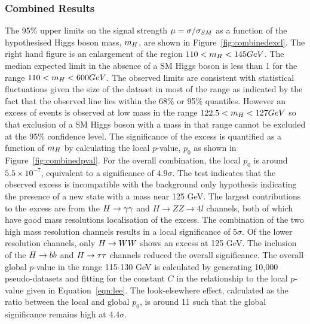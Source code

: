 \subsubsection{Combined Results}
\label{sec:combinedsearchresults}
The 95\% upper limits on the signal strength $\mu=\sigma/\sigma_{SM}$ as a function 
of the hypothesised Higgs boson mass, $m_{H}$, are shown in 
Figure~\ref{fig:combinedexcl}. The right hand figure is an enlargement of
the region $110 < m_{H}  < 145 GeV$. The median expected limit in the absence
of a SM Higgs boson is less than 1 for the range $110< m_{H}<600 GeV$. 
The observed limits are consistent with statistical fluctuations given the 
size of the dataset in most of the range as indicated by the fact that the 
observed line lies within the 68\% or 95\% quantiles. However an
excess of events is observed at low mass in the range $122.5  < m_{H} < 127 GeV$
so that exclusion of a SM Higgs boson with a mass in that range cannot be excluded
at the 95\% confidence level. The significance of the excess is quantified as a function
of $m_{H}$ by calculating the local $p$-value, $p_{0}$ as shown in Figure~\ref{fig:combinedpval}. 
For the overall combination, the local $p_{0}$ is around $5.5\times10^{-7}$, 
equivalent to a significance of $4.9\sigma$. The test indicates that the observed excess 
is incompatible with the background only hypothesis indicating the presence of 
a new state with a mass near 125 GeV.
The largest contributions to the excess are
from the $H\rightarrow\gamma\gamma$ and $H\rightarrow ZZ\rightarrow4l$ channels, 
both of which have good mass resolutions localisation
of the excess. The combination of the two 
high mass resolution channels results in a local significance of $5\sigma$. 
Of the lower resolution channels, only $H\rightarrow WW$ shows an excess at 125 GeV. The inclusion
of the $H\rightarrow bb$ and $H\rightarrow\tau\tau$ channels reduced the overall significance.
The overall global $p$-value in the range 115-130 GeV is calculated by 
generating 10,000 pseudo-datasets and fitting for the constant $C$ in 
the relationship to the local $p$-value given in Equation~\ref{eqn:lee}. The
look-elsewhere effect, calculated as the ratio between the local and global $p_{0}$, 
is around 11 such that the global significance remains high at $4.4\sigma$.

